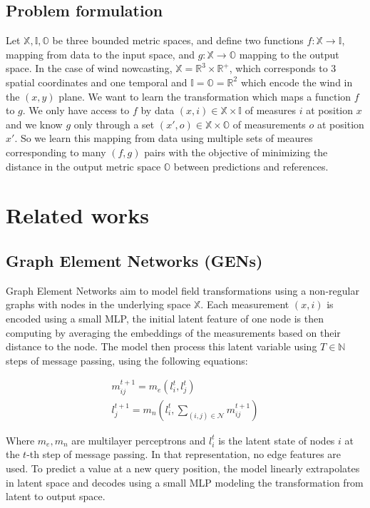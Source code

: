 \documentclass[a4paper,10pt]{article}
\begin{document}
\subsection{Problem formulation}

Let $\mathbb{X}, \mathbb{I}, \mathbb{O}$ be three bounded metric spaces, and define two functions $f : \mathbb{X}\rightarrow \mathbb{I}$, mapping from data to the input space, and $g : \mathbb{X}\rightarrow \mathbb{O}$ mapping to the output space.
In the case of wind nowcasting, $\mathbb{X} = \mathbb{R}^{3} \times \mathbb{R}^{+}$, which corresponds to 3 spatial coordinates and one temporal and $\mathbb{I} = \mathbb{O} = \mathbb{R}^{2}$ which encode the wind in the $(x,y)$ plane.
We want to learn the transformation which maps a function $f$ to $g$.
We only have access to $f$ by data $(x, i)  \in \mathbb{X} \times \mathbb{I}$ of measures $i$ at position $x$ and we know $g$ only through a set $(x', o) \in \mathbb{X} \times \mathbb{O}$ of measurements $o$ at position $x'$.
So we learn this mapping from data using multiple sets of meaures corresponding to many $(f,g)$ pairs with the objective of minimizing the distance in the output metric space $\mathbb{O}$ between predictions and references.

\section{Related works}

\subsection{Graph Element Networks (GENs)} \label{ssec:gen}
Graph Element Networks \cite{alet2019gen} aim to model field transformations using a non-regular graphs with nodes in the underlying space $\mathbb{X}$. Each measurement $(x, i)$ is encoded using a small MLP, the initial latent feature of one node is then computing by averaging the embeddings of the measurements based on their distance to the node. The model then process this latent variable using $T \in \mathbb{N}$ steps of message passing, using the following equations:

\begin{align}
  m_{ij}^{t + 1} = m_e(l_{i}^{t}, l_{j}^{t}) \\
  l_{j}^{t + 1} = m_{n}(l_{i}^{t}, \sum_{(i,j) \in \mathcal{N}} m_{ij}^{t + 1})
\end{align}

Where $m_e, m_n$ are multilayer perceptrons and $l_{i}^{t}$ is the latent state of nodes $i$ at the $t$-th step of message passing. In that representation, no edge features are used.
To predict a value at a new query position, the model linearly extrapolates in latent space and decodes using a small MLP modeling the transformation from latent to output space.
\end{document}
